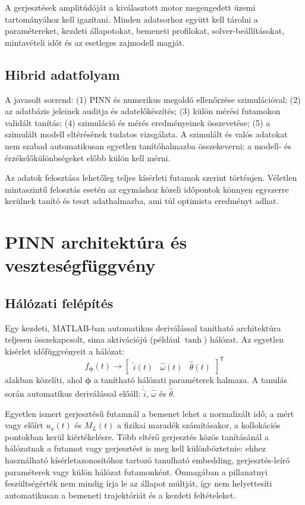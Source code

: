 \documentclass[11pt,a4paper]{article}
\newcommand{\vect}[1]{\boldsymbol{#1}}
\begin{document}
A gerjesztések amplitúdóját a kiválasztott motor megengedett üzemi tartományához kell igazítani. Minden adatsorhoz együtt kell tárolni a paramétereket, kezdeti állapotokat, bemeneti profilokat, solver-beállításokat, mintavételi időt és az esetleges zajmodell magját.

\subsection{Hibrid adatfolyam}

A javasolt sorrend: (1) PINN és numerikus megoldó ellenőrzése szimulációval; (2) az adatbázis jeleinek auditja és adatelőkészítés; (3) külön mérési futamokon validált tanítás; (4) szimuláció és mérés eredményeinek összevetése; (5) a szimulált modell eltérésének tudatos vizsgálata. A szimulált és valós adatokat nem szabad automatikusan egyetlen tanítóhalmazba összekeverni: a modell- és érzékelőkülönbségeket előbb külön kell mérni.

Az adatok felosztása lehetőleg teljes kísérleti futamok szerint történjen. Véletlen mintaszintű felosztás esetén az egymáshoz közeli időpontok könnyen egyszerre kerülnek tanító és teszt adathalmazba, ami túl optimista eredményt adhat.

\section{PINN architektúra és veszteségfüggvény}

\subsection{Hálózati felépítés}

Egy kezdeti, MATLAB-ban automatikus deriválással tanítható architektúra teljesen összekapcsolt, sima aktivációjú (például $\tanh$) hálózat. Az egyetlen kísérlet időfüggvényeit a hálózat:
\begin{equation}
  f_{\vect{\phi}}(t)\longrightarrow
  \begin{bmatrix}
    \hat{i}(t)&\hat{\omega}(t)&\hat{\theta}(t)
  \end{bmatrix}^{\mathsf T}
  \label{eq:network}
\end{equation}
alakban közelíti, ahol $\vect{\phi}$ a tanítható hálózati paraméterek halmaza. A tanulás során automatikus deriválással előáll:
$\dot{\hat{i}}$, $\dot{\hat{\omega}}$ és $\dot{\hat{\theta}}$.

Egyetlen ismert gerjesztésű futamnál a bemenet lehet a normalizált idő; a mért vagy előírt $u_a(t)$ és $M_L(t)$ a fizikai maradék számításakor, a kollokációs pontokban kerül kiértékelésre. Több eltérő gerjesztés közös tanításánál a hálózatnak a futamot vagy gerjesztést is meg kell különböztetnie: ehhez használható kísérletazonosítóhoz tartozó tanulható embedding, gerjesztés-leíró paraméterek vagy külön hálózat futamonként. Önmagában a pillanatnyi feszültségérték nem mindig írja le az állapot múltját, így nem helyettesíti automatikusan a bemeneti trajektóriát és a kezdeti feltételeket.
\end{document}
